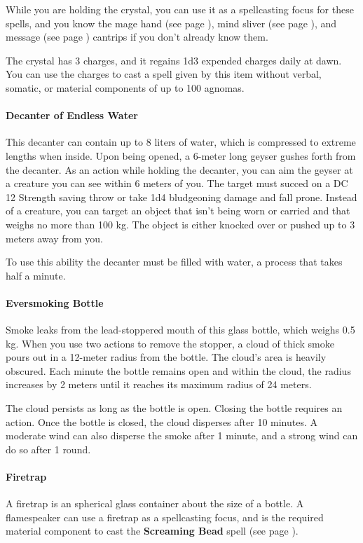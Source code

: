         While you are holding the crystal, you can use it as a spellcasting focus for these spells, and you know the mage hand (see page \pageref{spell::magehand}), mind sliver (see page \pageref{spell::mindsliver}), and message (see page \pageref{spell::message}) cantrips if you don't already know them.

        The crystal has 3 charges, and it regains 1d3 expended charges daily at dawn.
        You can use the charges to cast a spell given by this item without verbal, somatic, or material components of up to 100 agnomas.
    \paragraph{Decanter of Endless Water}
        This decanter can contain up to 8 liters of water, which is compressed to extreme lengths when inside.
        Upon being opened, a 6-meter long geyser gushes forth from the decanter.
        As an action while holding the decanter, you can aim the geyser at a creature you can see within 6 meters of you.
        The target must succed on a DC 12 Strength saving throw or take 1d4 bludgeoning damage and fall prone.
        Instead of a creature, you can target an object that isn't being worn or carried and that weighs no more than 100 kg.
        The object is either knocked over or pushed up to 3 meters away from you.

        To use this ability the decanter must be filled with water, a process that takes half a minute.
    \paragraph{Eversmoking Bottle}
        Smoke leaks from the lead-stoppered mouth of this glass bottle, which weighs 0.5 kg.
        When you use two actions to remove the stopper, a cloud of thick smoke pours out in a 12-meter radius from the bottle.
        The cloud's area is heavily obscured.
        Each minute the bottle remains open and within the cloud, the radius increases by 2 meters until it reaches its maximum radius of 24 meters.

        The cloud persists as long as the bottle is open.
        Closing the bottle requires an action.
        Once the bottle is closed, the cloud disperses after 10 minutes.
        A moderate wind can also disperse the smoke after 1 minute, and a strong wind can do so after 1 round.
    \paragraph{Firetrap}
        A firetrap is an spherical glass container about the size of a bottle.
        A flamespeaker can use a firetrap as a spellcasting focus, and is the required material component to cast the \textbf{Screaming Bead} spell (see page \pageref{spell::screamingbead}).
